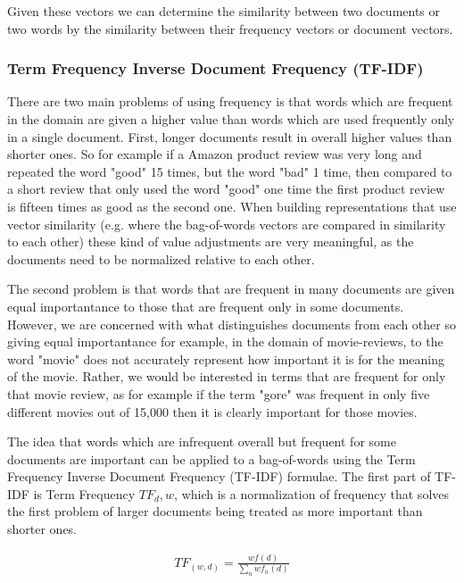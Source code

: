 Given these vectors we can determine the similarity between two documents or two words by the similarity between their frequency vectors or document vectors. %

\subsubsection{Term Frequency Inverse Document Frequency (TF-IDF)}

There are two main problems of using frequency is that words which are frequent in the domain are given a higher value than words which are used frequently only in a single document. First, longer documents result in overall higher values than shorter ones. So for example if a Amazon product review was very long and repeated the word "good" 15 times, but the word "bad" 1 time, then compared to a short review that only used the word "good" one time the first product review is fifteen times as good as the second one. When building representations that use vector similarity (e.g. where the bag-of-words vectors are compared in similarity to each other) these kind of value adjustments are very meaningful, as the documents need to be normalized relative to each other.


 The second problem is that words that are frequent in many documents are given equal importantance to those that are frequent only in some documents. However, we are concerned with what distinguishes documents from each other so giving equal importantance  for example, in the domain of movie-reviews, to the word "movie" does not accurately represent how important it is for the meaning of the movie. Rather, we would be interested in terms that are frequent for only that movie review, as for example if the term "gore" was frequent in only five different movies out of 15,000 then it is clearly important for those movies. 


The idea that words which are infrequent overall but frequent for some documents are important can be applied to a bag-of-words using the Term Frequency Inverse Document Frequency (TF-IDF) formulae. The first part of TF-IDF is Term Frequency $TF_d,w$, which is a normalization of frequency that solves the first problem of larger documents being treated as more important than shorter ones. 

\begin{align*}
TF_{(w, d)} =  \frac{{wf}(d)}{\sum_{n} {wf}_n(d)} 
\end{align*}

